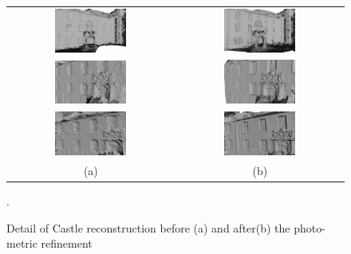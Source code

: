 \begin{figure}[tpb]
\centering
\begin{tabular}{cc}
\includegraphics[width=0.45\textwidth]{./img/ch-incr-dens/castle05}&
\includegraphics[width=0.45\textwidth]{./img/ch-incr-dens/castle06}\\
\includegraphics[width=0.45\textwidth]{./img/ch-incr-dens/castle07}&
\includegraphics[width=0.45\textwidth]{./img/ch-incr-dens/castle08}\\
\includegraphics[width=0.45\textwidth]{./img/ch-incr-dens/castle12}&
\includegraphics[width=0.45\textwidth]{./img/ch-incr-dens/castle11}\\
(a)&(b)
\end{tabular}
\caption{Detail of Castle reconstruction before (a) and after(b) the photo-metric refinement}.
\label{fig:detailcastle}
\end{figure}


